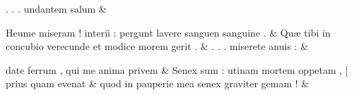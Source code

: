 \documentclass[12pt,onecolumn,twoside,a4paper]{memoir}
\begin{document}
\begin{pairs}
\begin{Leftside}
                              .
                              .
                              .
                              undantem
                              salum \&
                         \stanza 
                     
                              Heume
                              miseram
                              !
                              interii
                              :
                              pergunt
                              lavere
                              sanguen
                              sanguine
                              . \&
                         \stanza 
                     Quæ
                              tibi
                              in
                              concubio
                              verecunde
                              et
                              modice
                              morem
                              gerit
                              . \&
                         \stanza .
                              .
                              .
                              miserete
                              anuis
                              : &
                     
                              date
                              ferrum
                              ,
                              qui
                              me
                              anima
                              privem \&
                         \stanza Senex
                              sum
                              :
                              utinam
                              mortem
                              oppetam
                              ,
                              [
                              prius
                              quam
                              evenat &
                     quod
                              in
                              pauperie
                              mea
                              senex
                              graviter
                              gemam
                              ! \&
                     
                  \endnumbering
		\end{Leftside}
                  \begin{Rightside}
			\beginnumbering
			\numberstanzafalse
                     

\end{Rightside}
\end{pairs}
\end{document}
